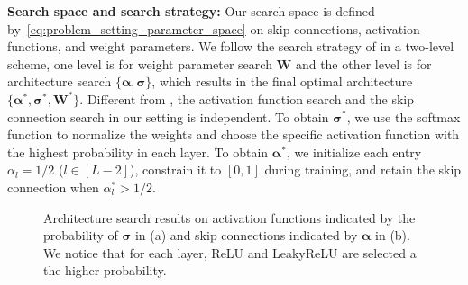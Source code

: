 \documentclass[nohyperref]{article}
\theoremstyle{plain}
\theoremstyle{definition}
\theoremstyle{remark}
\begin{document}
{\bf Search space and search strategy:} Our search space is defined by~\cref{eq:problem_setting_parameter_space} on skip connections, activation functions, and weight parameters.
We follow the search strategy of \citet{liu2019darts} in a two-level scheme, one level is for weight parameter search $\bm W$ and the other level is for architecture search $\{\bm \alpha, \bm \sigma \} $, which results in the final optimal architecture $\{ \bm \alpha^*, \bm \sigma^*, \bm W^* \}$. 
Different from \citet{liu2019darts}, the activation function search and the skip connection search in our setting is independent.
To obtain $\bm \sigma^*$, we use the softmax function to normalize the weights and choose the specific activation function with the highest probability in each layer.
To obtain $\bm \alpha^*$, we initialize each entry $\alpha_l = 1/2$ ($l\in[L-2]$), constrain it to $[0,1]$ during training, and retain the skip connection when $\alpha^*_l > 1/2$. 

\begin{figure}[t]
\centering
\caption{Architecture search results on activation functions indicated by the probability of $\bm \sigma$ in (a) and skip connections indicated by $\bm \alpha$ in (b). We notice that for each layer, ReLU and LeakyReLU are selected a the higher probability.}
\label{fig:DARTS_heatmap}
\end{figure}
\end{document}
